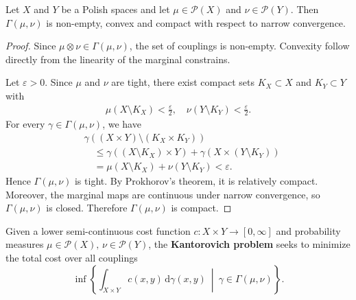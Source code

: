 \begin{lemma}
	Let $X$ and $Y$ be a Polish spaces and let $\mu\in \mathscr{P}(X)$ and $\nu \in \mathscr{P}(Y)$. Then $\Gamma(\mu,\nu)$ is non-empty, convex and compact with respect to narrow convergence. %
\end{lemma}
\begin{proof}
	Since $\mu\otimes\nu\in\Gamma(\mu,\nu)$, the set of couplings is non-empty. Convexity follow directly from the linearity of the marginal constrains.

	Let $\varepsilon > 0$. Since $\mu$ and $\nu$ are tight, there exist compact sets $K_X\subset X$ and $K_Y\subset Y$ with
	\begin{align*}
		\mu(X\setminus K_X)<\frac{\varepsilon}{2},\quad \nu(Y\setminus K_Y)<\frac{\varepsilon}{2}.
	\end{align*}
	For every $\gamma\in\Gamma(\mu,\nu)$, we have
	\begin{align*}
        &\gamma((X\times Y)
            \setminus(K_X\times K_Y))\\
        &\quad\leq
        \gamma((X\setminus K_X)\times Y)
        +\gamma(X\times(Y\setminus K_Y))\\
        &\quad=
        \mu(X\setminus K_X)
        +\nu(Y\setminus K_Y)
        <\varepsilon.
    \end{align*}
    Hence $\Gamma(\mu,\nu)$ is tight. By Prokhorov's theorem, it is relatively
    compact. Moreover, the marginal maps
    are continuous under narrow convergence,
    so $\Gamma(\mu,\nu)$ is closed. Therefore $\Gamma(\mu,\nu)$ is compact.

\end{proof}

\begin{definition}
	Given a lower semi-continuous cost function $c:X\times Y\to [0,\infty]$ and probability measures $\mu\in\mathscr{P}(X),\,\nu\in\mathscr{P}(Y)$, the \textbf{Kantorovich problem} seeks to minimize the total cost over all couplings
	$$
	\inf\left\{\int_{X\times Y} c(x,y)\,\mathrm{d}\gamma(x,y)\ \middle|\ \gamma\in\Gamma(\mu,\nu)\right\}.
	$$
\end{definition}

